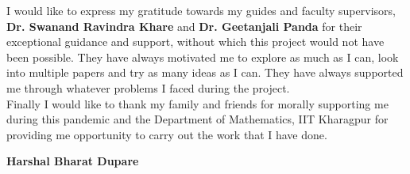 % 
\begin{acknowledgements}

I would like to express my gratitude towards my guides and faculty supervisors, \textbf{Dr. Swanand Ravindra Khare} and \textbf{Dr. Geetanjali Panda} for their exceptional guidance and support, without which  this project would not have been possible. They have always motivated me to explore as much as I can, look into multiple papers and try as many ideas as I can. They have always supported me through whatever problems I faced during the project.\\

Finally I would like to thank my family and friends for morally supporting me during this pandemic and the Department of Mathematics, IIT Kharagpur for providing me opportunity to carry out the work that I have done.
\\[1cm]
\begin{flushright}
\textbf{Harshal Bharat Dupare}
\end{flushright}

\end{acknowledgements}